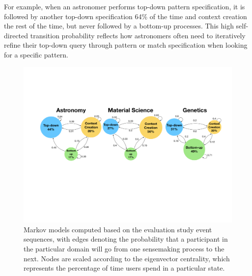 For example, when an astronomer performs top-down pattern specification, 
it is followed by another top-down specification 
64\% of the time and context creation the rest of the time, 
but never followed by a bottom-up processes. 
This high self-directed transition probability 
reflects how astronomers often need to iteratively 
refine their top-down query through pattern 
or match specification when looking for a specific pattern. %
\begin{figure}[h!]
  \includegraphics[width=\linewidth]{figures/markov_transition.pdf}
  \caption{Markov models computed based on the evaluation study event sequences, with edges denoting the probability that a participant in the particular domain will go from one sensemaking process to the next. Nodes are scaled according to the eigenvector centrality, which represents the percentage of time users spend in a particular state.}\label{fig:transition}
\end{figure}

